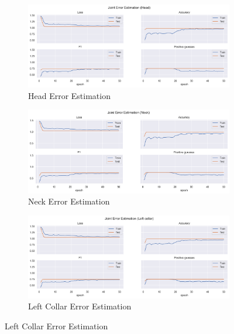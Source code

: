 \begin{figure}[!ht]
    \centering
    \begin{subfigure}[b]{0.47\linewidth}
        \centering
        \includegraphics[width=\textwidth]{figures/Results/v2/jt/Head_ErrorEstimation.png}
        \caption{Head Error Estimation}
        \label{fig:v2_head_jt_ee}
    \end{subfigure}
    \hfill
    \begin{subfigure}[b]{0.47\linewidth}
        \centering
        \includegraphics[width=\textwidth]{figures/Results/v2/jt/Neck_ErrorEstimation.png}
        \caption{Neck Error Estimation}
        \label{fig:v2_neck_jt_ee}
    \end{subfigure}
    \hfill
    \begin{subfigure}[b]{0.47\linewidth}
        \centering
        \includegraphics[width=\textwidth]{figures/Results/v2/jt/Left collar_ErrorEstimation.png}
        \caption{Left Collar Error Estimation}

\end{subfigure}
\end{figure}
